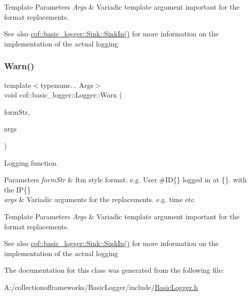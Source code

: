 \begin{DoxyTemplParams}{Template Parameters}
{\em Args} & Variadic template argument important for the format replacements. \\
\hline
\end{DoxyTemplParams}
\begin{DoxySeeAlso}{See also}
\hyperlink{classcof_1_1basic__logger_1_1_sink_a085f8c690add00cf55ef0754c5900397}{cof\+::basic\+\_\+logger\+::\+Sink\+::\+Sink\+In()} for more information on the implementation of the actual logging 
\end{DoxySeeAlso}
\mbox{\label{classcof_1_1basic__logger_1_1_logger_ad518be9654acd1d698c6a8eb50262d52}} 
\subsubsection{\texorpdfstring{Warn()}{Warn()}}
{\footnotesize\ttfamily template$<$typename... Args$>$ \\
void cof\+::basic\+\_\+logger\+::\+Logger\+::\+Warn (\begin{DoxyParamCaption}\item[{const char $\ast$}]{form\+Str,  }\item[{const Args \&...}]{args }\end{DoxyParamCaption})\hspace{0.3cm}{\ttfamily [inline]}}



Logging function. 


\begin{DoxyParams}{Parameters}
{\em form\+Str} & ftm style format. e.\+g. {\ttfamily User \#\+ID\{\} logged in at \{\}. with the IP\{\}} \\
\hline
{\em args} & Variadic arguments for the replacements. e.\+g. time etc. \\
\hline
\end{DoxyParams}

\begin{DoxyTemplParams}{Template Parameters}
{\em Args} & Variadic template argument important for the format replacements. \\
\hline
\end{DoxyTemplParams}
\begin{DoxySeeAlso}{See also}
\hyperlink{classcof_1_1basic__logger_1_1_sink_a085f8c690add00cf55ef0754c5900397}{cof\+::basic\+\_\+logger\+::\+Sink\+::\+Sink\+In()} for more information on the implementation of the actual logging 
\end{DoxySeeAlso}


The documentation for this class was generated from the following file\+:\begin{DoxyCompactItemize}
\item 
A\+:/collectionofframeworks/\+Basic\+Logger/include/\hyperlink{_basic_logger_8h}{Basic\+Logger.\+h}\end{DoxyCompactItemize}
